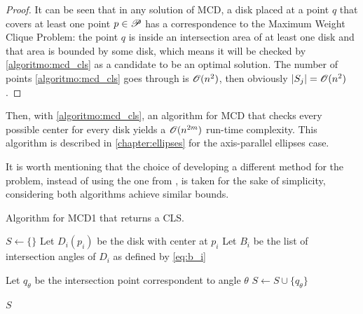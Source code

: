 \begin{proof}
It can be seen that in any solution of MCD, a disk placed at a point $q$ that covers at least one point $p \in \mathscr{P}$ has a correspondence to the Maximum Weight Clique Problem: the point $q$ is inside an intersection area of at least one disk and that area is bounded by some disk, which means it will be checked by \autoref{algoritmo:mcd_cls} as a candidate to be an optimal solution. The number of points \autoref{algoritmo:mcd_cls} goes through is $\mathscr{O}(n^2)$, then
obviously $|S_j|=\mathscr{O}(n^2)$.
\end{proof}

Then, with \autoref{algoritmo:mcd_cls}, an algorithm for MCD that checks every possible center for every disk yields a $\mathscr{O}(n^{2m})$ run-time complexity.
This algorithm is described in \autoref{chapter:ellipses} for the axis-parallel ellipses case.

It is worth mentioning that the choice of developing a different method for the problem, instead of using the one from , is taken for the sake of simplicity, considering both algorithms achieve similar bounds.

\begin{algoritmo}
	\caption{Algorithm for MCD1 that returns a CLS.}\label{algoritmo:mcd_cls}
	\begin{algorithmic}[1]
		
		\item[]
		
		\State $S \gets \{\}$
		\State Let $D_i(p_i)$ be the disk with center at $p_i$
		\State Let $B_i$ be the list of intersection angles of $D_i$ as defined by \autoref{eq:b_i}
		
		\State Let $q_\theta$ be the intersection point correspondent to angle $\theta$
		\State $S \gets S \cup \{q_\theta\}$	
		\EndIf
		\EndFor
		\EndFor
		
		\State \Return $S$
		\EndProcedure
	\end{algorithmic}
\end{algoritmo}